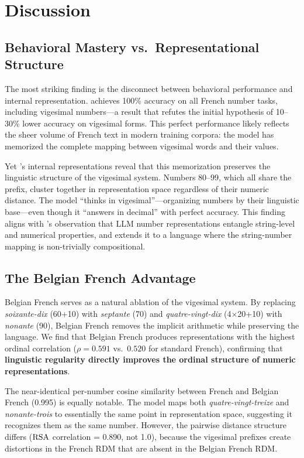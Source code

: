 \section{Discussion}
\label{sec:discussion}

\subsection{Behavioral Mastery vs.\ Representational Structure}
\label{sec:disc_mastery}

The most striking finding is the disconnect between behavioral performance and internal representation.
\gptmodel achieves 100\% accuracy on all French number tasks, including vigesimal numbers---a result that refutes the initial hypothesis of 10--30\% lower accuracy on vigesimal forms.
This perfect performance likely reflects the sheer volume of French text in modern training corpora: the model has memorized the complete mapping between vigesimal words and their values.

Yet \mistral's internal representations reveal that this memorization preserves the linguistic structure of the vigesimal system.
Numbers 80--99, which all share the \quatrevingt prefix, cluster together in representation space regardless of their numeric distance.
The model ``thinks in vigesimal''---organizing numbers by their linguistic base---even though it ``answers in decimal'' with perfect accuracy.
This finding aligns with \citet{marjieh2025number}'s observation that LLM number representations entangle string-level and numerical properties, and extends it to a language where the string-number mapping is non-trivially compositional.

\subsection{The Belgian French Advantage}
\label{sec:disc_belgian}

Belgian French serves as a natural ablation of the vigesimal system.
By replacing \emph{soixante-dix} (60+10) with \emph{septante} (70) and \emph{quatre-vingt-dix} (4$\times$20+10) with \emph{nonante} (90), Belgian French removes the implicit arithmetic while preserving the language.
We find that Belgian French produces representations with the highest ordinal correlation ($\rho = 0.591$ vs.\ $0.520$ for standard French), confirming that \textbf{linguistic regularity directly improves the ordinal structure of numeric representations}.

The near-identical per-number cosine similarity between French and Belgian French (0.995) is equally notable.
The model maps both \emph{quatre-vingt-treize} and \emph{nonante-trois} to essentially the same point in representation space, suggesting it recognizes them as the same number.
However, the pairwise distance structure differs ($\text{RSA}$ correlation = 0.890, not 1.0), because the vigesimal prefixes create distortions in the French RDM that are absent in the Belgian French RDM.

